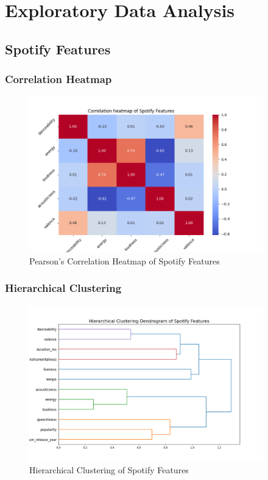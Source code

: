 \chapter{Exploratory Data Analysis}
\label{cha:eda}


\section{Spotify Features}
\label{sec:spotifyfeatures}

\subsection*{Correlation Heatmap}
\label{sec:correlationheatmapsspotifyfeatures}

\begin{center}
\begin{figure}[H]
  \centering
  \includegraphics[width=4in]{img/corr_heatmap_spotify_features.png}
  \caption{Pearson's Correlation Heatmap of Spotify Features}
  \label{Figure:fig_beh}
\end{figure}
\end{center}

\subsection*{Hierarchical Clustering}
\label{sec:hierarchicalclustering}

\begin{center}
\begin{figure}[H]
  \centering
  \includegraphics[width=4in]{img/dendrogram_spotify_features.png}
  \caption{Hierarchical Clustering of Spotify Features}
  \label{Figure:dendrogram_spotify_features}
\end{figure}
\end{center}


